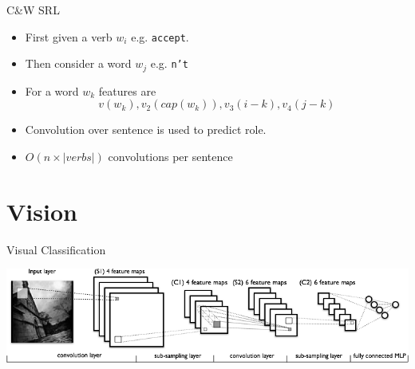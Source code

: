 \documentclass{beamer}
\begin{document}
\begin{frame}{C\&W SRL }
  \begin{itemize}
  \item   First given a verb $w_i$ e.g. \texttt{accept}.
    \air 
  \item  Then consider a word $w_j$ e.g. \texttt{n't}
    \air
  \item  For a word $w_k$ features are 
    \[v(w_k), v_2(cap(w_k)), v_3(i-k), v_4(j-k)\]

    \air
  \item Convolution over sentence is used to predict role.
    \air 
  \item $O(n \times |verbs|)$ convolutions per sentence
  \end{itemize}
\end{frame}

{

}

{

}


{

}

{

}

{

}

\section{Vision}
\begin{frame}{Visual Classification}
  \begin{center}
    \includegraphics[width=\textwidth]{mylenet}
  \end{center}
\end{frame}
\end{document}
